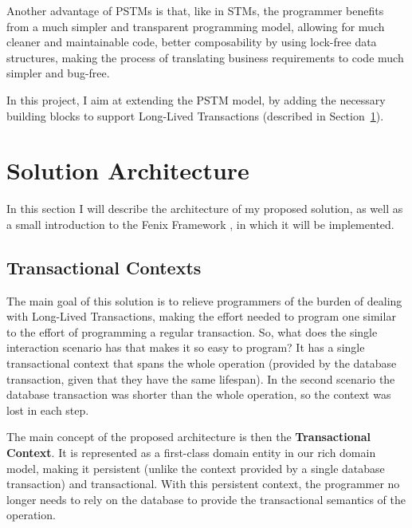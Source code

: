 \documentclass{llncs}
\begin{document}
Another advantage of PSTMs is that, like in STMs, the programmer
benefits from a much simpler and transparent programming model,
allowing for much cleaner and maintainable code, better composability
by using lock-free data structures, making the process of translating
business requirements to code much simpler and bug-free.

In this project, I aim at extending the PSTM model, by adding the
necessary building blocks to support Long-Lived Transactions
(described in Section~\ref{sec:arch}).

\section{Solution Architecture}
\label{sec:arch}

In this section I will describe the architecture of my proposed
solution, as well as a small introduction to the Fenix Framework
\cite{fernandes2011strict}, in which it will be implemented.

\subsection{Transactional Contexts}

The main goal of this solution is to relieve programmers of the burden
of dealing with Long-Lived Transactions, making the effort needed to
program one similar to the effort of programming a regular
transaction. So, what does the single interaction scenario has that
makes it so easy to program? It has a single transactional context
that spans the whole operation (provided by the database transaction,
given that they have the same lifespan). In the second scenario the
database transaction was shorter than the whole operation, so the
context was lost in each step.

The main concept of the proposed architecture is then the {\bf
  Transactional Context}. It is represented as a first-class domain
entity in our rich domain model, making it persistent (unlike the
context provided by a single database transaction) and
transactional. With this persistent context, the programmer no longer
needs to rely on the database to provide the transactional semantics
of the operation.
\end{document}
